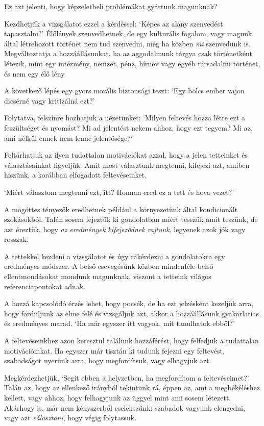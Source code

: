 Ez azt jelenti, hogy képzeletbeli problémákat gyártunk magunknak?

Kezdhetjük a vizsgálatot ezzel a kérdéssel: `Képes az alany szenvedést
tapasztalni?' Élőlények szenvedhetnek, de egy kulturális fogalom, vagy
magunk által létrehozott történet nem tud szenvedni, még ha közben
\emph{mi} szenvedünk is. Megváltoztatja a hozzáállásunkat, ha az
aggodalmunk tárgya csak történetként létezik, mint egy intézmény,
nemzet, pénz, hírnév vagy egyéb társadalmi történet, és nem egy élő
lény.

A következő lépés egy gyors morális biztonsági teszt: `Egy bölcs ember
vajon dicsérné vagy kritizálná ezt?'

Folytatva, felszínre hozhatjuk a nézetünket: `Milyen feltevés hozza
létre ezt a feszültséget és nyomást? Mi ad jelentést nekem ahhoz, hogy
ezt tegyem? Mi az, ami nélkül ennek nem lenne jelentősége?'

Feltárhatjuk az ilyen tudattalan motivációkat azzal, hogy a jelen
tetteinket és választásainkat figyeljük. Amit most választunk megtenni,
kifejezi azt, amiben hiszünk, a korábban elfogadott feltevéseinket.

`Miért választom megtenni ezt, itt? Honnan ered ez a tett és hova
vezet?'

A mögöttes tényezők eredhetnek például a környezetünk által kondicionált
szokásokból. Talán sosem fejeztük ki gondolatban miért tesszük amit
teszünk, de azt éreztük, hogy \emph{az eredmények kifejeződnek rajtunk},
legyenek azok jók vagy rosszak.

A tettekkel kezdeni a vizsgálatot és úgy rákérdezni a gondolatokra egy
eredményes módszer. A belső csevegésünk közben mindenféle belső
ellentmondásokat mondunk magunknak, viszont a tetteink világos
referenciapontokat adnak.


A hozzá kapcsolódó érzés lehet, hogy pocsék, de ha ezt jelzésként
kezeljük arra, hogy forduljunk az elme felé és vizsgáljuk azt, akkor a
hozzáállásunk gyakorlatias és eredményes marad. `Ha már egyszer itt
vagyok, mit tanulhatok ebből?'

A feltevéseinkhez azon keresztül találunk hozzáférést, hogy felfedjük a
tudattalan motivációinkat. Ha egyszer már tisztán ki tudunk fejezni egy
feltevést, szabadságot nyerünk arra, hogy megfordítsuk, vagy elhagyjuk
azt.

Megkérdezhetjük, `Segít ebben a helyzetben, ha megfordítom a
feltevéseimet?' Talán az, hogy az ellenkező irányból tekintünk rá, éppen
az, ami a megbékéléshez kellett, vagy ahhoz, hogy felhagyjunk az üggyel
mint ami sosem létezett. Akárhogy is, már nem kényszerből cselekszünk:
szabadok vagyunk elengedni, vagy azt \emph{választani}, hogy végig
folytassuk.

